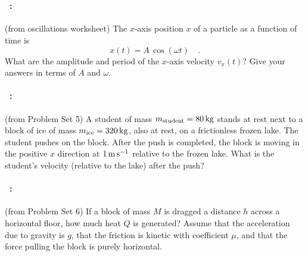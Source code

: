 \documentclass[12pt]{article}
\begin{document}
\vfill
~
\clearpage
\paragraph{\problemname~\theproblem:}%
(from oscillations worksheet)
The $x$-axis position $x$ of a particle as a function of time is
$$
x(t) = A\,\cos(\omega t) \quad .
$$
What are the amplitude and period of the $x$-axis velocity $v_x(t)$?
Give your answers in terms of $A$ and $\omega$.

\vfill

\paragraph{\problemname~\theproblem:}%
(from Problem Set 5)
A student of mass $m_\mathrm{student}=80\,\mathrm{kg}$ stands at rest next to
a block of ice of mass $m_\mathrm{ice}=320\,\mathrm{kg}$, also at rest, on a
frictionless frozen lake.  The student pushes on the block. After the
push is completed, the block is moving in the positive $x$ direction at $1\,\mathrm{m}\,\mathrm{s}^{-1}$
relative to the frozen lake.
What is the student's velocity (relative to the lake) after the push?


\vfill

\paragraph{\problemname~\theproblem:}%
(from Problem Set 6)
If a block of mass $M$ is dragged a distance $h$ across a horizontal floor,
how much heat $Q$ is generated? Assume that the acceleration due to
gravity is $g$, that the friction is kinetic with
coefficient $\mu$, and that the force pulling the block is purely
horizontal.

\vfill
~
\end{document}
